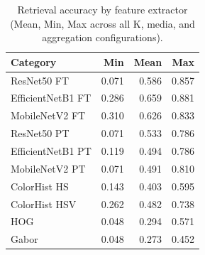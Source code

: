 \begin{table}[ht]
\centering
\caption{Retrieval accuracy by feature extractor (Mean, Min, Max across all K, media, and aggregation configurations).}
\label{tab:by_extractor}
\small
\begin{tabular}{@{}lrrr@{}}
\toprule
Category & Min & Mean & Max \\
\midrule
ResNet50 FT & 0.071 & 0.586 & 0.857 \\
EfficientNetB1 FT & 0.286 & 0.659 & 0.881 \\
MobileNetV2 FT & 0.310 & 0.626 & 0.833 \\
ResNet50 PT & 0.071 & 0.533 & 0.786 \\
EfficientNetB1 PT & 0.119 & 0.494 & 0.786 \\
MobileNetV2 PT & 0.071 & 0.491 & 0.810 \\
ColorHist HS & 0.143 & 0.403 & 0.595 \\
ColorHist HSV & 0.262 & 0.482 & 0.738 \\
HOG & 0.048 & 0.294 & 0.571 \\
Gabor & 0.048 & 0.273 & 0.452 \\
\bottomrule
\end{tabular}
\end{table}
